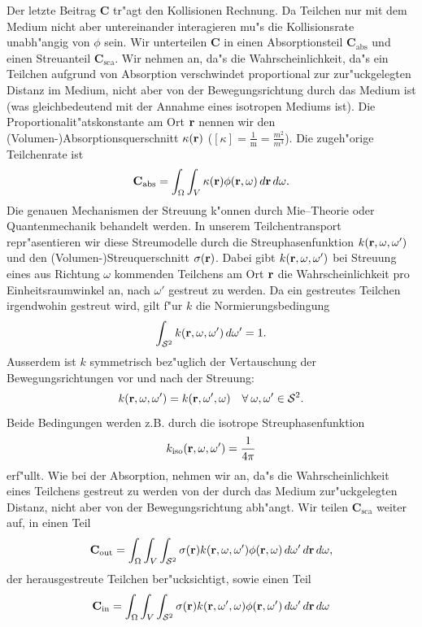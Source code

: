 \documentclass[11pt,a4paper,DIVcalc,BCOR8mm,titlepage,twoside]{scrartcl}
\begin{document}
	Der letzte Beitrag $\mathbf{C}$ tr"agt den Kollisionen Rechnung. Da Teilchen nur mit dem Medium nicht aber untereinander interagieren mu"s die Kollisionsrate unabh"angig von $\phi$ sein. Wir unterteilen $\mathbf{C}$ in einen Absorptionsteil $\mathbf{C}_\text{abs}$ und einen Streuanteil $\mathbf{C}_\text{sca}$. Wir nehmen an, da"s die Wahrscheinlichkeit, da"s ein Teilchen aufgrund von Absorption verschwindet proportional zur zur"uckgelegten Distanz im Medium, nicht aber von der Bewegungsrichtung durch das Medium ist (was gleichbedeutend mit der Annahme eines isotropen Mediums ist). Die Proportionalit"atskonstante am Ort $\mathbf{r}$ nennen wir den (Volumen-)Absorptionsquerschnitt $\kappa(\mathbf{r})$ ($[\kappa]=\frac{1}{\text{m}}=\frac{m^2}{m^3}$). Die zugeh"orige Teilchenrate ist
	$$\mathbf{C}_\text{abs}=\int_\Omega \int_V \kappa(\mathbf{r})\phi(\mathbf{r},\omega)\,d\mathbf{r}\,d\omega.$$
	Die genauen Mechanismen der Streuung k"onnen durch Mie--Theorie oder Quantenmechanik behandelt werden. In unserem Teilchentransport repr"asentieren wir diese Streumodelle durch die Streuphasenfunktion $k(\mathbf{r},\omega,\omega')$ und den (Volumen-)Streuquerschnitt $\sigma(\mathbf{r})$. Dabei gibt $k(\mathbf{r},\omega,\omega')$ bei Streuung eines aus Richtung $\omega$ kommenden Teilchens am Ort $\mathbf{r}$ die Wahrscheinlichkeit pro Einheitsraumwinkel an, nach $\omega'$ gestreut zu werden. Da ein gestreutes Teilchen irgendwohin gestreut wird, gilt f"ur $k$ die Normierungsbedingung
	\begin{equation}\label{eq:k_norm_req}
	  \int_{\mathcal{S}^2} k(\mathbf{r},\omega,\omega')\,d\omega'=1.
	\end{equation}
	Ausserdem ist $k$ symmetrisch bez"uglich der Vertauschung der Bewegungsrichtungen vor und nach der Streuung:
	$$k(\mathbf{r},\omega,\omega')=k(\mathbf{r},\omega',\omega)\quad \forall\:\omega,\omega'\in\mathcal{S}^2.$$
	Beide Bedingungen werden z.B. durch die isotrope Streuphasenfunktion $$k_\text{iso}(\mathbf{r},\omega,\omega')=\frac{1}{4\pi}$$ erf"ullt.
	Wie bei der Absorption, nehmen wir an, da"s die Wahrscheinlichkeit eines Teilchens gestreut zu werden von der durch das Medium zur"uckgelegten Distanz, nicht aber von der Bewegungsrichtung abh"angt. Wir teilen $\mathbf{C}_\text{sca}$ weiter auf, in einen Teil
	$$\mathbf{C}_\text{out}=\int_\Omega \int_V \int_{\mathcal{S}^2} \sigma{(\mathbf{r})}k(\mathbf{r},\omega,\omega')\phi(\mathbf{r},\omega)\,d\omega'\,d\mathbf{r}\,d\omega,$$
	der herausgestreute Teilchen ber"ucksichtigt, sowie einen Teil
	$$\mathbf{C}_\text{in}=\int_\Omega \int_V \int_{\mathcal{S}^2} \sigma{(\mathbf{r})}k(\mathbf{r},\omega',\omega)\phi(\mathbf{r},\omega')\,d\omega'\,d\mathbf{r}\,d\omega$$
\end{document}
